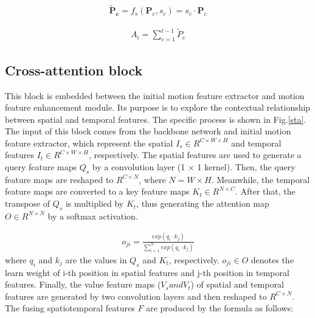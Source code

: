 \documentclass[12pt]{article}
\begin{document}
\begin{equation}
\label{scale}
\begin{aligned}
   \bm{\tilde{P}_c} = f_{s}(\bm{P}_c, s_c) = s_c \cdot \textbf{P}_c
\end{aligned}
\end{equation}

\begin{equation}
\label{sum_scale}
\begin{aligned}
   A_i = \sum\limits_{c=1}^{t-1}\tilde{P}_c
 \end{aligned}
\end{equation}
 
\subsection{Cross-attention block} 

This block is embedded between the initial motion feature extractor and motion feature enhancement module. Its purpose is to explore the contextual relationship between spatial and temporal features. The specific process is shown in Fig.\ref{sta}. The input of this block comes from the backbone network and initial motion feature extractor, which represent the spatial $I_s \in R^{C \times W \times H}$ and temporal features $I_t \in R^{C \times W \times H}$, respectively. The spatial features are used to generate a query feature maps $Q_s$ by a convolution layer (1 $\times$ 1 kernel). Then, the query feature maps are reshaped to $R^{C \times N}$, where $N = W \times H $. Meanwhile, the temporal feature maps are converted to a key feature maps $K_t \in R^{N \times C}$. After that, the transpose of $Q_s$ is multiplied by $K_t$, thus generating the attention map $O \in R^{N \times N}$ by a softmax activation.

\begin{equation}
\label{sta}
\begin{aligned}
   o_{ji} = \frac{exp(q_i \cdot k_j)}{\sum_{i=1}^{N}exp(q_i \cdot k_j)}
 \end{aligned}
\end{equation} where $q_i$ and $k_j$ are the values in $Q_s$ and $K_t$, respectively. $o_{ji} \in O$ denotes the learn weight of i-th position in spatial features and j-th position in temporal features. Finally, the value feature maps ($V_s and V_t$) of spatial and temporal features are generated by two convolution layers and then reshaped to $R^{C \times N}$. The fusing spatiotemporal features $F$ are produced by the formula as follows:
\end{document}
